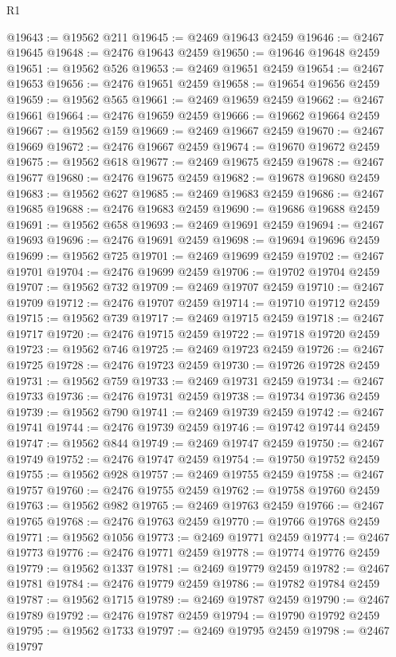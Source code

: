 \begin{lexlean}{R1}
\begin{coremodule}
@19643 := @19562 @211
@19645 := @2469 @19643 @2459
@19646 := @2467 @19645
@19648 := @2476 @19643 @2459
@19650 := @19646 @19648 @2459
@19651 := @19562 @526
@19653 := @2469 @19651 @2459
@19654 := @2467 @19653
@19656 := @2476 @19651 @2459
@19658 := @19654 @19656 @2459
@19659 := @19562 @565
@19661 := @2469 @19659 @2459
@19662 := @2467 @19661
@19664 := @2476 @19659 @2459
@19666 := @19662 @19664 @2459
@19667 := @19562 @159
@19669 := @2469 @19667 @2459
@19670 := @2467 @19669
@19672 := @2476 @19667 @2459
@19674 := @19670 @19672 @2459
@19675 := @19562 @618
@19677 := @2469 @19675 @2459
@19678 := @2467 @19677
@19680 := @2476 @19675 @2459
@19682 := @19678 @19680 @2459
@19683 := @19562 @627
@19685 := @2469 @19683 @2459
@19686 := @2467 @19685
@19688 := @2476 @19683 @2459
@19690 := @19686 @19688 @2459
@19691 := @19562 @658
@19693 := @2469 @19691 @2459
@19694 := @2467 @19693
@19696 := @2476 @19691 @2459
@19698 := @19694 @19696 @2459
@19699 := @19562 @725
@19701 := @2469 @19699 @2459
@19702 := @2467 @19701
@19704 := @2476 @19699 @2459
@19706 := @19702 @19704 @2459
@19707 := @19562 @732
@19709 := @2469 @19707 @2459
@19710 := @2467 @19709
@19712 := @2476 @19707 @2459
@19714 := @19710 @19712 @2459
@19715 := @19562 @739
@19717 := @2469 @19715 @2459
@19718 := @2467 @19717
@19720 := @2476 @19715 @2459
@19722 := @19718 @19720 @2459
@19723 := @19562 @746
@19725 := @2469 @19723 @2459
@19726 := @2467 @19725
@19728 := @2476 @19723 @2459
@19730 := @19726 @19728 @2459
@19731 := @19562 @759
@19733 := @2469 @19731 @2459
@19734 := @2467 @19733
@19736 := @2476 @19731 @2459
@19738 := @19734 @19736 @2459
@19739 := @19562 @790
@19741 := @2469 @19739 @2459
@19742 := @2467 @19741
@19744 := @2476 @19739 @2459
@19746 := @19742 @19744 @2459
@19747 := @19562 @844
@19749 := @2469 @19747 @2459
@19750 := @2467 @19749
@19752 := @2476 @19747 @2459
@19754 := @19750 @19752 @2459
@19755 := @19562 @928
@19757 := @2469 @19755 @2459
@19758 := @2467 @19757
@19760 := @2476 @19755 @2459
@19762 := @19758 @19760 @2459
@19763 := @19562 @982
@19765 := @2469 @19763 @2459
@19766 := @2467 @19765
@19768 := @2476 @19763 @2459
@19770 := @19766 @19768 @2459
@19771 := @19562 @1056
@19773 := @2469 @19771 @2459
@19774 := @2467 @19773
@19776 := @2476 @19771 @2459
@19778 := @19774 @19776 @2459
@19779 := @19562 @1337
@19781 := @2469 @19779 @2459
@19782 := @2467 @19781
@19784 := @2476 @19779 @2459
@19786 := @19782 @19784 @2459
@19787 := @19562 @1715
@19789 := @2469 @19787 @2459
@19790 := @2467 @19789
@19792 := @2476 @19787 @2459
@19794 := @19790 @19792 @2459
@19795 := @19562 @1733
@19797 := @2469 @19795 @2459
@19798 := @2467 @19797

\end{coremodule}
\end{lexlean}
